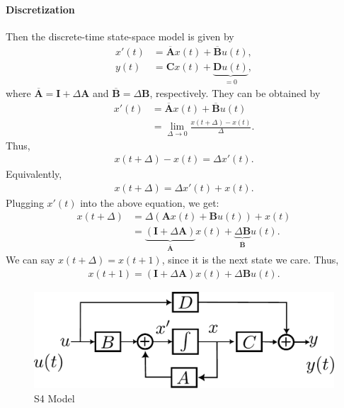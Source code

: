 \paragraph{Discretization} Then the discrete-time state-space model is given by
\begin{align*}
	x'(t) &= \overline{\mathbf{A}}x(t)+\overline{\mathbf{B}}u(t),\\
	y(t) &= \mathbf{C}x(t)+\underbrace{\mathbf{D}u(t)}_{=0},
\end{align*}
where $\overline{\mathbf{A}} = \mathbf{I}+\Delta \mathbf{A}$ and $\overline{\mathbf{B}} = \Delta \mathbf{B}$, respectively. They can be obtained by
\begin{align*}
	x'(t) &= \overline{\mathbf{A}}x(t)+\overline{\mathbf{B}}u(t)\\
		  &= \lim_{\Delta\to 0} \frac{x(t+\Delta)-x(t)}{\Delta}.
\end{align*}
Thus, 
\begin{align*}
	x(t+\Delta)-x(t) = \Delta x'(t).
\end{align*}
Equivalently, 
\begin{align*}
	x(t+\Delta) = \Delta x'(t)+x(t). 
\end{align*}
Plugging $x'(t)$ into the above equation, we get:
\begin{align*}
	x(t+\Delta) &= \Delta (\mathbf{A}x(t)+\mathbf{B}u(t)) +x(t) \\
				&= \underbrace{(\mathbf{I}+\Delta \mathbf{A})}_{\overline{\mathbf{A}}}x(t)+\underbrace{\Delta \mathbf{B}}_{\overline{\mathbf{B}}}u(t).
\end{align*}
We can say $x(t+\Delta)=x(t+1)$, since it is the next state we care. Thus, 
\begin{align*}
	x(t+1)= (\mathbf{I}+\Delta \mathbf{A})x(t)+\Delta \mathbf{B}u(t).
\end{align*}




\begin{figure}[h]
	\centering
	\includegraphics[scale=0.6]{./images/nlp/ssm.pdf}
	\caption{S4 Model}
	\label{fig:nlp_s4_model}
\end{figure}


